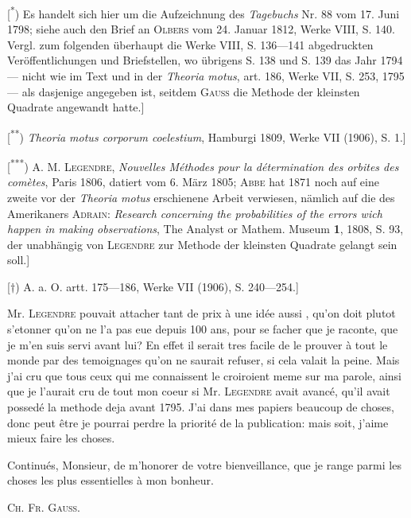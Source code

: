 {\small
\noindent\hspace*{\parindent}[\textsuperscript{*}) Es handelt sich hier um die Aufzeichnung des \textit{Tagebuchs} Nr. 88 vom 17. Juni 1798; siehe auch den Brief an \textsc{Olbers} vom 24. Januar 1812, Werke VIII, S. 140. Vergl. zum folgenden überhaupt die Werke VIII, S. 136—141 abgedruckten Veröffentlichungen und Briefstellen, wo übrigens S. 138 und S. 139 das Jahr 1794 — nicht wie im Text und in der \textit{Theoria motus}, art. 186, Werke VII, S. 253, 1795 — als dasjenige angegeben ist, seitdem \textsc{Gauss} die Methode der kleinsten Quadrate angewandt hatte.]
\par\noindent\hspace*{\parindent}[\textsuperscript{**}) \textit{Theoria motus corporum coelestium}, Hamburgi 1809, Werke VII (1906), S. 1.]
\par\noindent\hspace*{\parindent}[\textsuperscript{***}) \textsc{A. M. Legendre}, \textit{Nouvelles Méthodes pour la détermination des orbites des comètes}, Paris 1806, datiert vom 6. März 1805; \textsc{Abbe} hat 1871 noch auf eine zweite vor der \textit{Theoria motus} erschienene Arbeit verwiesen, nämlich auf die des Amerikaners \textsc{Adrain}: \textit{Research concerning the probabilities of the errors wich happen in making observations}, The Analyst or Mathem. Museum \textbf{1}, 1808, S. 93, der unabhängig von \textsc{Legendre} zur Methode der kleinsten Quadrate gelangt sein soll.]
\par\noindent\hspace*{\parindent}[$\dagger$) A. a. O. artt. 175—186, Werke VII (1906), S. 240—254.]
\par}
\clearpage{}
\noindent Mr. \textsc{Legendre} pouvait attacher tant de prix à une idée aussi , qu’on doit plutot s’etonner qu’on ne l’a pas eue depuis 100 ans, pour se facher que je raconte, que je m’en suis servi avant lui? En effet il serait tres facile de le prouver à tout le monde par des temoignages qu’on ne saurait refuser, si cela valait la peine. Mais j’ai cru que tous ceux qui me connaissent le croiroient meme sur ma parole, ainsi que je l’aurait cru de tout mon coeur si Mr. \textsc{Legendre} avait avancé, qu’il avait possedé la methode deja avant 1795. J’ai dans mes papiers beaucoup de choses, donc peut être je pourrai perdre la priorité de la publication: mais soit, j’aime mieux faire  les choses.
\par\noindent{}\par
\indent Continués, Monsieur, de m’honorer de votre bienveillance, que je range parmi les choses les plus essentielles à mon bonheur.
\par\noindent\hfill\textsc{Ch. Fr. Gauss.}\par
